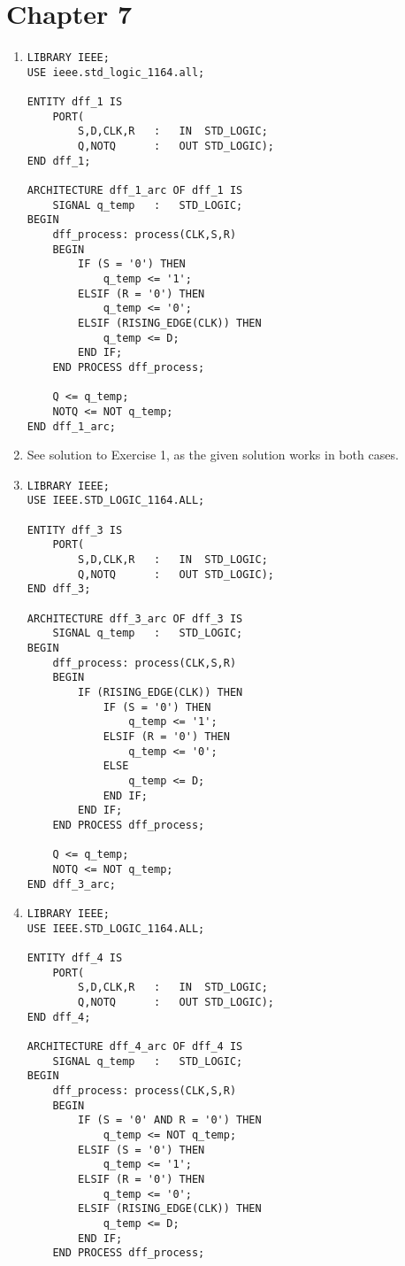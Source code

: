 \section*{Chapter 7}
\begin{enumerate}
	\item
	\begin{lstlisting}
LIBRARY IEEE;
USE ieee.std_logic_1164.all;

ENTITY dff_1 IS
	PORT(
		S,D,CLK,R	:	IN	STD_LOGIC;
		Q,NOTQ		:	OUT	STD_LOGIC);
END dff_1;

ARCHITECTURE dff_1_arc OF dff_1 IS
	SIGNAL q_temp	:	STD_LOGIC;
BEGIN
	dff_process: process(CLK,S,R) 
	BEGIN
		IF (S = '0') THEN
			q_temp <= '1';
		ELSIF (R = '0') THEN
			q_temp <= '0';
		ELSIF (RISING_EDGE(CLK)) THEN
			q_temp <= D;
		END IF;
	END PROCESS dff_process;

	Q <= q_temp;
	NOTQ <= NOT q_temp;
END dff_1_arc;
	\end{lstlisting}
	\item See solution to Exercise 1, as the given solution works in both cases.

	\item
	\begin{lstlisting}
LIBRARY IEEE;
USE IEEE.STD_LOGIC_1164.ALL;

ENTITY dff_3 IS
	PORT(
		S,D,CLK,R	:	IN	STD_LOGIC;
		Q,NOTQ		:	OUT	STD_LOGIC);
END dff_3;

ARCHITECTURE dff_3_arc OF dff_3 IS
	SIGNAL q_temp	:	STD_LOGIC;
BEGIN
	dff_process: process(CLK,S,R) 
	BEGIN
		IF (RISING_EDGE(CLK)) THEN
			IF (S = '0') THEN
				q_temp <= '1';
			ELSIF (R = '0') THEN
				q_temp <= '0';
			ELSE
				q_temp <= D;
			END IF;
		END IF;
	END PROCESS dff_process;

	Q <= q_temp;
	NOTQ <= NOT q_temp;
END dff_3_arc;
	\end{lstlisting}

	\item
	\begin{lstlisting}
LIBRARY IEEE;
USE IEEE.STD_LOGIC_1164.ALL;

ENTITY dff_4 IS
	PORT(
		S,D,CLK,R	:	IN	STD_LOGIC;
		Q,NOTQ		:	OUT	STD_LOGIC);
END dff_4;

ARCHITECTURE dff_4_arc OF dff_4 IS
	SIGNAL q_temp	:	STD_LOGIC;
BEGIN
	dff_process: process(CLK,S,R) 
	BEGIN
		IF (S = '0' AND R = '0') THEN
			q_temp <= NOT q_temp;
		ELSIF (S = '0') THEN
			q_temp <= '1';
		ELSIF (R = '0') THEN
			q_temp <= '0';
		ELSIF (RISING_EDGE(CLK)) THEN
			q_temp <= D;
		END IF;
	END PROCESS dff_process;


\end{lstlisting}
\end{enumerate}
